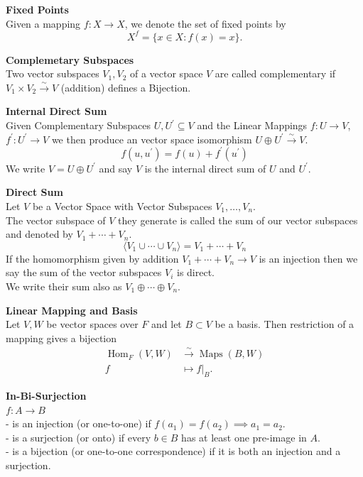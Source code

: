 \documentclass[a4paper, 10pt]{article}
\begin{document}
\begin{multicols*}{3}
\textbf{Fixed Points}\\
Given a mapping $f: X \rightarrow X$, we denote the set of fixed points by
$$
X^f=\{x \in X: f(x)=x\} .
$$

\textbf{Complemetary Subspaces}\\
Two vector subspaces $V_1, V_2$ of a vector space $V$ are called complementary if $V_1 \times V_2 \stackrel{\sim}{\rightarrow} V$ (addition) defines a Bijection.

\textbf{Internal Direct Sum}\\
Given Complementary Subspaces $U, U^{\prime}\subseteq V$ and the Linear Mappings $f:U\rightarrow V$, $f^{\prime}:U^{\prime}\rightarrow V$ 
we then produce an vector space isomorphism $U \oplus U^\prime \stackrel{\sim}{\rightarrow} V$. 
$$f\left(u,u^{\prime}\right)=f\left(u\right)+ f^{\prime}\left(u^\prime\right)$$
We write $V=U \oplus U^{\prime}$ and say $V$ is the internal direct sum of $U$ and $U^\prime$.

\textbf{Direct Sum}\\
Let $V$ be a Vector Space with Vector Subspaces $V_1, \ldots, V_n$. \\
The vector subspace of $V$ they generate is called the sum of our vector subspaces and denoted by $V_1+\cdots+V_n$. \\
$$\langle V_1\cup\cdots\cup V_n\rangle=V_1+\cdots+V_n$$
If the homomorphism given by addition $V_1+\cdots+V_n \rightarrow V$ is an injection then we say the sum of the vector subspaces $V_i$ is direct.\\
We write their sum also as $V_1 \oplus \cdots \oplus V_n$.

\textbf{Linear Mapping and Basis}\\
Let $V, W$ be vector spaces over $F$ and let $B \subset V$ be a basis. Then restriction of a mapping gives a bijection
\begin{align*}
\operatorname{Hom}_F(V, W) & \stackrel{\sim}{\rightarrow} \operatorname{Maps}(B, W) \\
f & \left.\mapsto f\right|_B .
\end{align*}

\textbf{In-Bi-Surjection}\\
$f: A \rightarrow B$\\
- is an injection (or one-to-one) if $f(a_1) = f(a_2)\implies a_1 = a_2$.\\
- is a surjection (or onto) if every $b \in B$ has at least one pre-image in $A$.\\
- is a bijection (or one-to-one correspondence) if it is both an injection and a surjection.


\end{multicols*}
\end{document}
